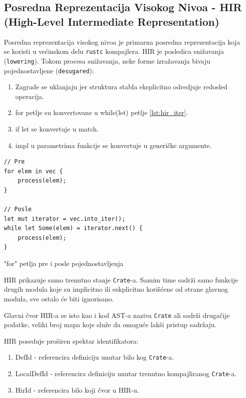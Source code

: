 \documentclass[11pt]{article}
\begin{document}
\newpage
\subsection{Posredna Reprezentacija Visokog Nivoa - HIR (High-Level Intermediate Representation)}


Posredna reprezentacija visokog nivoa je primarna posredna reprezentacija koja se koristi 
u većinskom delu \verb|rustc| kompajlera. HIR je posledica snižavanja (\verb|lowering|). 
Tokom procesa snižavanja, neke forme izražavanja bivaju pojednostavljene (\verb|desugared|):
\begin{enumerate}
    \item Zagrade se uklanjaju jer struktura stabla eksplicitno odredjuje redosled operacija.
    \item for petlje su konvertovane u while(let) petlje \ref{lst:hir_iter}.
    \item if let se konvertuje u match.
    \item impl u parametrima funkcije se konvertuje u generičke argumente.
\end{enumerate}

\begin{listing}[H]
\begin{verbatim}
// Pre
for elem in vec {
    process(elem);
}

// Posle
let mut iterator = vec.into_iter();
while let Some(elem) = iterator.next() {
    process(elem);
}
\end{verbatim}
\caption{"for" petlja pre i posle pojednostavljenja}
\label{lst:hir_iter}
\end{listing}

HIR prikazuje samo trenutno stanje \verb|Crate|-a.
Samim time sadrži samo funkcije drugih modula koje su implicitno ili eskplicitno korišćene 
od strane glavnog modula, sve ostalo će biti ignorisano.

Glavni čvor HIR-a se isto kao i kod AST-a naziva \verb|Crate| ali sadrži drugačije podatke,
veliki broj mapa koje služe da omoguće lakši pristup sadržaju.

HIR poseduje proširen spektar identifikatora:
\begin{enumerate}
    \item DefId - referencira definiciju unutar bilo kog \verb|Crate|-a.
    \item LocalDefId - referencira definiciju unutar trenutno kompajliranog \verb|Crate|-a.
    \item HirId - referencira bilo koji čvor u HIR-u.
\end{enumerate}
\end{document}
